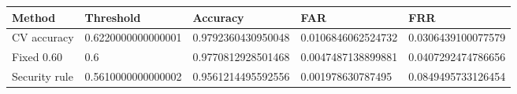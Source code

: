 \begin{table}
\centering
\begin{tabular}{lllll}
\toprule
Method & Threshold & Accuracy & FAR & FRR \\
\midrule
CV accuracy & 0.6220000000000001 & 0.9792360430950048 & 0.0106846062524732 & 0.0306439100077579 \\
Fixed 0.60 & 0.6 & 0.9770812928501468 & 0.0047487138899881 & 0.0407292474786656 \\
Security rule & 0.5610000000000002 & 0.9561214495592556 & 0.001978630787495 & 0.0849495733126454 \\
\bottomrule
\end{tabular}
\end{table}